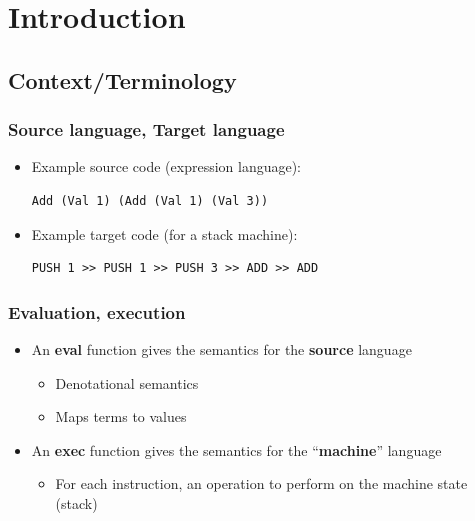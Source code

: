 \section{Introduction}

    \subsection{Context/Terminology}

        \begin{frame}[fragile]
            \frametitle{Source language, Target language}

            \begin{itemize}
                \item Example source code (expression language):
                \begin{verbatim}
Add (Val 1) (Add (Val 1) (Val 3))
                \end{verbatim}

                \item Example target code (for a stack machine):
                \begin{verbatim}
PUSH 1 >> PUSH 1 >> PUSH 3 >> ADD >> ADD
                \end{verbatim}
            \end{itemize}
\end{frame}

    \begin{frame}
        \frametitle{Evaluation, execution}

        \begin{itemize}
            \item An \textbf{eval} function gives the semantics for the \textbf{source} language
                \begin{itemize}
                    \item Denotational semantics
                    \item Maps terms to values
                \end{itemize}

            \item An \textbf{exec} function gives the semantics for the ``\textbf{machine}'' language
                \begin{itemize}
                    \item For each instruction, an operation to perform on the machine state (stack)
                \end{itemize}
        \end{itemize}
    \end{frame}


